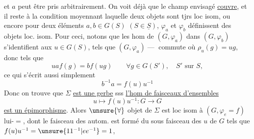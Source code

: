et $a$ peut être pris arbitrairement. On voit déjà
que le champ envisagé \uline{couvre}, et il reste
à  la condition moyennant laquelle deux
objets sont tjrs loc isom, ou encore
pour deux éléments $a,b\in G(S)$ $(S\in\underline S)$,
$\varphi_a$ et $\varphi_b$ définissent des objets loc. isom.
Pour ceci, notons que les hom de
$(G,\varphi_a)$ dans $(G,\varphi_b)$ s'identifient aux $u\in G(S)$,
tels que
$(G,\varphi_a)\mathbin{\text{---}}$
commute
où $\rho_u(g)=ug$, donc tels que
\[
u a f(g)=b f(ug)\qquad \forall g\in G(S'),\quad S'\text{ sur }S,
\]
ce qui s'écrit aussi simplement
\[
b^{-1}a=f(u)u^{-1}
\]
Donc on trouve que $\Sigma$ \uline{est une gerbe} sss
\uline{l'hom de faisceaux d'ensembles}
\[
u\longmapsto f(u)u^{-1}:G\longrightarrow G
\]
\uline{est un épimorphisme}. Alors $\unsure{\forall}$ objet de
$\Sigma$ est loc isom à $(G,\varphi_e=f)$ lui-$=$,
dont le faisceau des autom. est formé du
sous faisceau des $u$ de $G$ tels que $f(u)u^{-1}=\unsure{11^{-1}|ee^{-1}}=1$,

